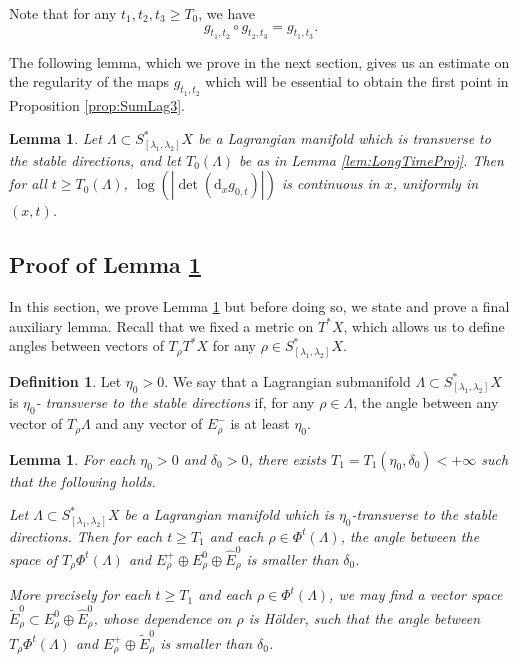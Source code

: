 \documentclass[10pt]{amsart}
\newcommand{\sd}{\mathrm{d}}
\theoremstyle{plain}
\newtheorem{lemma}[theorem]{Lemma}
\theoremstyle{definition}
\newtheorem{definition}[theorem]{Definition}
\begin{document}
Note that for any $t_1,t_2,t_3 \geq T_0$, we have
\begin{equation}\label{eq:Fonctorialite}
g_{t_1,t_2} \circ g_{t_2,t_3} = g_{t_1,t_3}.
\end{equation}

The following lemma, which we prove in the next section, gives us an estimate on the regularity of the maps $g_{t_1,t_2}$ which will be essential to obtain the first point in Proposition \ref{prop:SumLag3}.

\begin{lemma}\label{lem:LaBorneChiante}
Let $\Lambda\subset S_{[\lambda_1,\lambda_2]}^*X$ be a Lagrangian manifold which is transverse to the stable directions, and let $T_0(\Lambda)$ be as in Lemma \ref{lem:LongTimeProj}.
Then for all $t\geq T_0(\Lambda)$, $\log(|{\det}(\sd _x g_{0,t})|)$ is continuous in $x$, uniformly in $(x,t)$.
\end{lemma}

\subsection{Proof of Lemma \ref{lem:LaBorneChiante}}\label{ss:labornechiante}
In this section, we prove Lemma \ref{lem:LaBorneChiante} but before doing so, we state and prove a final auxiliary lemma. Recall that we fixed a metric on $T^*X$, which allows us to define angles between vectors of $T_\rho T^*X$ for any $\rho\in S_{[\lambda_1,\lambda_2]}^*X$.

\begin{definition}\label{def:EtaTransversalite}
Let $\eta_0>0$. We say that a Lagrangian submanifold $\Lambda\subset S_{[\lambda_1,\lambda_2]}^*X$ is \emph{$\eta_0$- transverse to the stable directions} if, for any $\rho\in \Lambda$, the angle between any vector of $T_\rho\Lambda$ and any vector of $E_\rho^-$ is at least $\eta_0$.
\end{definition}

\begin{lemma}\label{l:charts}
For each $\eta_0>0$ and $\delta_0>0$, there exists $T_1=T_1(\eta_0,\delta_0)<+\infty$ such that the following holds.

Let $\Lambda\subset S_{[\lambda_1,\lambda_2]}^*X$ be a Lagrangian manifold which is $\eta_0$-transverse to the stable directions. Then for each $t\geq T_1$ and each $\rho\in \Phi^t(\Lambda)$, the angle between the space of $T_\rho\Phi^t(\Lambda)$ and $E_\rho^+\oplus E_\rho^0\oplus \hat{E}_\rho^0$ is smaller than $\delta_0$.

More precisely for each $t\geq T_1$ and each $\rho\in \Phi^t(\Lambda)$, we may find a vector space $\tilde{E}^0_\rho \subset E_\rho^0\oplus \hat{E}_\rho^0$, whose dependence on $\rho$ is Hölder, such that
the angle between $T_\rho\Phi^t(\Lambda)$ and $E_\rho^+\oplus \tilde{E}_\rho^0$ is smaller than $\delta_0$.
\end{lemma}
\end{document}
